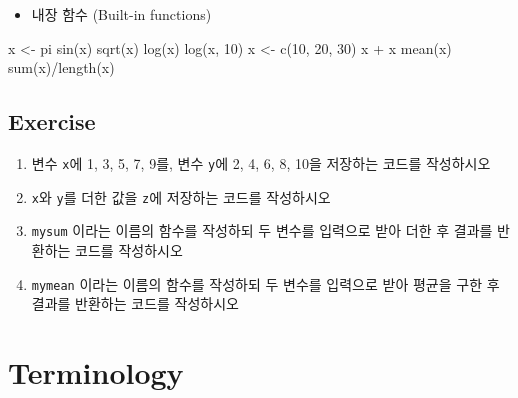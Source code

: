 \documentclass[
]{book}
\newenvironment{Shaded}{\begin{snugshade}}{\end{snugshade}}
\newcommand{\DecValTok}[1]{\textcolor[rgb]{0.00,0.00,0.81}{#1}}
\newcommand{\FunctionTok}[1]{\textcolor[rgb]{0.00,0.00,0.00}{#1}}
\newcommand{\NormalTok}[1]{#1}
\newcommand{\OtherTok}[1]{\textcolor[rgb]{0.56,0.35,0.01}{#1}}
\newcommand{\SpecialCharTok}[1]{\textcolor[rgb]{0.00,0.00,0.00}{#1}}
\providecommand{\tightlist}{%
  \setlength{\itemsep}{0pt}\setlength{\parskip}{0pt}}
\begin{document}
\begin{itemize}
\tightlist
\item
  내장 함수 (Built-in functions)
\end{itemize}

\begin{Shaded}
\begin{Highlighting}[]
\NormalTok{x }\OtherTok{\textless{}{-}}\NormalTok{ pi}
\FunctionTok{sin}\NormalTok{(x)}
\FunctionTok{sqrt}\NormalTok{(x)}
\FunctionTok{log}\NormalTok{(x)}
\FunctionTok{log}\NormalTok{(x, }\DecValTok{10}\NormalTok{)}
\NormalTok{x }\OtherTok{\textless{}{-}} \FunctionTok{c}\NormalTok{(}\DecValTok{10}\NormalTok{, }\DecValTok{20}\NormalTok{, }\DecValTok{30}\NormalTok{)}
\NormalTok{x }\SpecialCharTok{+}\NormalTok{ x}
\FunctionTok{mean}\NormalTok{(x)}
\FunctionTok{sum}\NormalTok{(x)}\SpecialCharTok{/}\FunctionTok{length}\NormalTok{(x)}
\end{Highlighting}
\end{Shaded}

\hypertarget{exercise-3}{%
\subsection{Exercise}\label{exercise-3}}

\begin{enumerate}
\def\labelenumi{\arabic{enumi}.}
\item
  변수 \texttt{x}에 1, 3, 5, 7, 9를, 변수 \texttt{y}에 2, 4, 6, 8, 10을 저장하는 코드를 작성하시오
\item
  \texttt{x}와 \texttt{y}를 더한 값을 \texttt{z}에 저장하는 코드를 작성하시오
\item
  \texttt{mysum} 이라는 이름의 함수를 작성하되 두 변수를 입력으로 받아 더한 후 결과를 반환하는 코드를 작성하시오
\item
  \texttt{mymean} 이라는 이름의 함수를 작성하되 두 변수를 입력으로 받아 평균을 구한 후 결과를 반환하는 코드를 작성하시오
\end{enumerate}

\hypertarget{terminology}{%
\section{Terminology}\label{terminology}}
\end{document}
